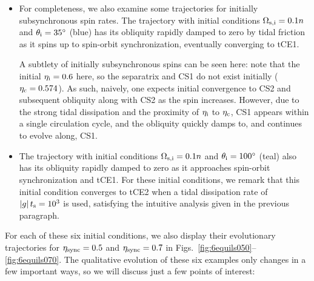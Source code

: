 \documentclass[
        fleqn,
        usenatbib,
    ]{mnras}
\newcommand*{\abs}[1]{\left|#1\right|}
\begin{document}
\begin{itemize}
    \item For completeness, we also examine some trajectories for initially
        subsynchronous spin rates. The trajectory with initial conditions
        $\Omega_{\rm s, i} = 0.1n$ and $\theta_{\rm i} = 35^\circ$ (blue) has its
        obliquity rapidly damped to zero by tidal friction as it spins up to
        spin-orbit synchronization, eventually converging to tCE1.

        A subtlety of initially subsynchronous spins can be seen here: note that
        the initial $\eta_{\rm i} = 0.6$ here, so the separatrix and CS1 do not
        exist initially ($\eta_{\rm c} = 0.574$). As such, naively, one expects
        initial convergence to CS2 and subsequent obliquity along with CS2 as
        the spin increases. However, due to the strong tidal dissipation and the
        proximity of $\eta_{\rm i}$ to $\eta_{\rm c}$, CS1 appears within a
        single circulation cycle, and the obliquity quickly damps to, and
        continues to evolve along, CS1.

    \item The trajectory with initial conditions $\Omega_{\rm s, i} = 0.1n$ and
        $\theta_{\rm i} = 100^\circ$ (teal) also has its obliquity rapidly
        damped to zero as it approaches spin-orbit synchronization and tCE1. For
        these initial conditions, we remark that this initial condition
        converges to tCE2 when a tidal dissipation rate of $\abs{g}t_{\rm s} =
        10^3$ is used, satisfying the intuitive analysis given in the previous
        paragraph.
\end{itemize}
For each of these six initial conditions, we also display their evolutionary
trajectories for $\eta_{\rm sync} = 0.5$ and $\eta_{\rm sync} = 0.7$ in
Figs.~\ref{fig:6equils050}--\ref{fig:6equils070}. The qualitative evolution of
these six examples only changes in a few important ways, so we will discuss just
a few points of interest:
\end{document}

